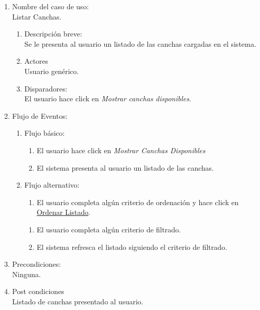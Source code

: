\documentclass[a4paper,11pt]{article}
\begin{document}
\begin{enumerate}

    \item Nombre del caso de uso: \\
    Listar Canchas.

    \begin{enumerate}
    \item Descripción breve: \\
        Se le presenta al usuario un listado de las canchas cargadas en el sistema.
    \item Actores \\
        Usuario genérico.
    \item Disparadores: \\
        El usuario hace click en \emph{Mostrar canchas disponibles}.
    \end{enumerate}

    \item Flujo de Eventos: \\

    \begin{enumerate}

        \item Flujo básico:\\
        \begin{enumerate}
                    \item El usuario hace click en \emph{Mostrar Canchas Disponibles}
                    \item El sistema presenta al usuario un listado de las canchas.
        \end{enumerate}
        \item Flujo alternativo:\\
        \begin{enumerate}
                    \item El usuario completa algún criterio de ordenación y
                        hace click en \underline{Ordenar Listado}.
        \end{enumerate}
        \begin{enumerate}
                \item El usuario completa algún criterio de filtrado.
                \item El sistema refresca el listado siguiendo el criterio de filtrado.
        \end{enumerate}
    \end{enumerate}

    \item Precondiciones: \\
        Ninguna.

    \item Post condiciones \\
        Listado de canchas presentado al usuario.

\end{enumerate}
\end{document}
